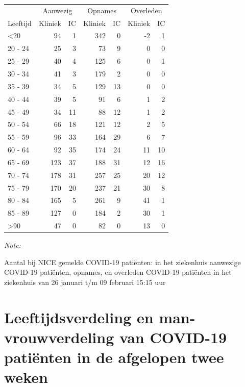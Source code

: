 \documentclass[
  english,
  man,floatsintext]{apa6}
\begin{document}
\begin{table}
\centering\begingroup\fontsize{10}{12}\selectfont

\begin{threeparttable}
\begin{tabular}{lrrrrrr}
\toprule
\multicolumn{1}{c}{ } & \multicolumn{2}{c}{Aanwezig} & \multicolumn{2}{c}{Opnames} & \multicolumn{2}{c}{Overleden} \\
\cmidrule(l{3pt}r{3pt}){2-3} \cmidrule(l{3pt}r{3pt}){4-5} \cmidrule(l{3pt}r{3pt}){6-7}
Leeftijd & Kliniek & IC & Kliniek & IC & Kliniek & IC\\
\midrule
<20 & 94 & 1 & 342 & 0 & -2 & 1\\
20 - 24 & 25 & 3 & 73 & 9 & 0 & 0\\
25 - 29 & 40 & 4 & 125 & 6 & 0 & 1\\
30 - 34 & 41 & 3 & 179 & 2 & 0 & 0\\
35 - 39 & 34 & 5 & 129 & 13 & 0 & 0\\
40 - 44 & 39 & 5 & 91 & 6 & 1 & 2\\
45 - 49 & 34 & 11 & 88 & 12 & 1 & 2\\
50 - 54 & 66 & 18 & 121 & 12 & 2 & 5\\
55 - 59 & 96 & 33 & 164 & 29 & 6 & 7\\
60 - 64 & 92 & 35 & 174 & 24 & 11 & 10\\
65 - 69 & 123 & 37 & 188 & 31 & 12 & 16\\
70 - 74 & 178 & 31 & 257 & 25 & 20 & 12\\
75 - 79 & 170 & 20 & 237 & 21 & 30 & 8\\
80 - 84 & 165 & 5 & 261 & 9 & 41 & 1\\
85 - 89 & 127 & 0 & 184 & 2 & 30 & 1\\
>90 & 47 & 0 & 82 & 0 & 13 & 0\\
\bottomrule
\end{tabular}
\begin{tablenotes}
\item \textit{Note: } 
\item Aantal bij NICE gemelde COVID-19 patiënten: in het ziekenhuis aanwezige COVID-19 patiënten, opnames, en overleden COVID-19 patiënten in het ziekenhuis van 26 januari t/m 09 februari 15:15 uur
\end{tablenotes}
\end{threeparttable}
\endgroup{}
\end{table}

\newpage

\hypertarget{leeftijdsverdeling-en-man-vrouwverdeling-van-covid-19-patiuxebnten-in-de-afgelopen-twee-weken}{%
\section{Leeftijdsverdeling en man-vrouwverdeling van COVID-19 patiënten in de afgelopen twee weken}\label{leeftijdsverdeling-en-man-vrouwverdeling-van-covid-19-patiuxebnten-in-de-afgelopen-twee-weken}}
\end{document}
